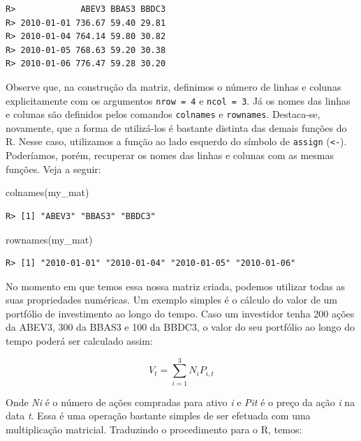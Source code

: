 \documentclass[
  11pt,
]{book}
\newenvironment{Shaded}{\begin{snugshade}}{\end{snugshade}}
\newcommand{\FunctionTok}[1]{\textcolor[rgb]{0,0,0}{#1}}
\newcommand{\NormalTok}[1]{#1}
\begin{document}
\begin{verbatim}
R>             ABEV3 BBAS3 BBDC3
R> 2010-01-01 736.67 59.40 29.81
R> 2010-01-04 764.14 59.80 30.82
R> 2010-01-05 768.63 59.20 30.38
R> 2010-01-06 776.47 59.28 30.20
\end{verbatim}

Observe que, na construção da matriz, definimos o número de linhas e colunas explicitamente com os argumentos \texttt{nrow\ =\ 4} e \texttt{ncol\ =\ 3}. Já os nomes das linhas e colunas são definidos pelos comandos \texttt{colnames} e \texttt{rownames}. Destaca-se, novamente, que a forma de utilizá-los é bastante distinta das demais funções do R. Nesse caso, utilizamos a função ao lado esquerdo do símbolo de \texttt{assign} (\texttt{\textless{}-}). Poderíamos, porém, recuperar os nomes das linhas e colunas com as mesmas funções. Veja a seguir:  

\begin{Shaded}
\begin{Highlighting}[]
\FunctionTok{colnames}\NormalTok{(my\_mat)}
\end{Highlighting}
\end{Shaded}

\begin{verbatim}
R> [1] "ABEV3" "BBAS3" "BBDC3"
\end{verbatim}

\begin{Shaded}
\begin{Highlighting}[]
\FunctionTok{rownames}\NormalTok{(my\_mat)}
\end{Highlighting}
\end{Shaded}

\begin{verbatim}
R> [1] "2010-01-01" "2010-01-04" "2010-01-05" "2010-01-06"
\end{verbatim}

No momento em que temos essa nossa matriz criada, podemos utilizar todas as suas propriedades numéricas. Um exemplo simples é o cálculo do valor de um portfólio de investimento ao longo do tempo. Caso um investidor tenha 200 ações da ABEV3, 300 da BBAS3 e 100 da BBDC3, o valor do seu portfólio ao longo do tempo poderá ser calculado assim:

\[V _t = \sum _{i=1} ^{3} N _i P_{i,t}\]

Onde \emph{Ni} é o número de ações compradas para ativo \emph{i} e \emph{Pit} é o preço da ação \emph{i} na data \emph{t}. Essa é uma operação bastante simples de ser efetuada com uma multiplicação matricial. Traduzindo o procedimento para o R, temos:
\end{document}
